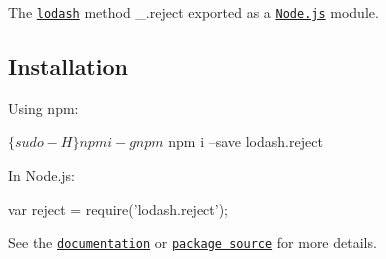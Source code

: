 The \href{https://lodash.com/}{\tt lodash} method {\ttfamily \+\_\+.\+reject} exported as a \href{https://nodejs.org/}{\tt Node.\+js} module.

\subsection*{Installation}

Using npm\+: 
\begin{DoxyCode}
$ \{sudo -H\} npm i -g npm
$ npm i --save lodash.reject
\end{DoxyCode}


In Node.\+js\+: 
\begin{DoxyCode}
var reject = require('lodash.reject');
\end{DoxyCode}


See the \href{https://lodash.com/docs#reject}{\tt documentation} or \href{https://github.com/lodash/lodash/blob/4.6.0-npm-packages/lodash.reject}{\tt package source} for more details. 